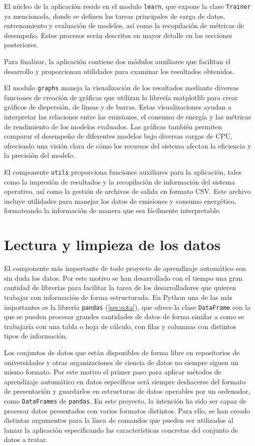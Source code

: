 El núcleo de la aplicación reside en el modulo \texttt{learn}, que expone la clase \texttt{Trainer} ya mencionada, donde se definen las tareas principales de carga de datos, entrenamiento y evaluación de modelos, así como la recopilación de métricas de desempeño. Estos procesos serán descritos en mayor detalle en las secciones posteriores.

Para finalizar, la aplicación contiene dos módulos auxiliares que facilitan el desarrollo y proporcionan utilidades para examinar los resultados obtenidos.

El modulo \texttt{graphs} maneja la visualización de los resultados mediante diversas funciones de creación de gráficas que utilizan la librería matplotlib para crear gráficos de dispersión, de líneas y de barras. Estas visualizaciones ayudan a interpretar las relaciones entre las emisiones, el consumo de energía y las métricas de rendimiento de los modelos evaluados. Las gráficas también permiten comparar el desempeño de diferentes modelos bajo diversas cargas de CPU, ofreciendo una visión clara de cómo los recursos del sistema afectan la eficiencia y la precisión del modelo.

El componente \texttt{utils} proporciona funciones auxiliares para la aplicación, tales como la impresión de resultados y la recopilación de información del sistema operativo, así como la gestión de archivos de salida en formato CSV. Este archivo incluye utilidades para manejar los datos de emisiones y consumo energético, formateando la información de manera que sea fácilmente interpretable. 


\section{Lectura y limpieza de los datos}
\label{sec:limpieza}

El componente más importante de todo proyecto de aprendizaje automático son sin duda los datos. Por este motivo se han desarrollado con el tiempo una gran cantidad de librerías para facilitar la tarea de los desarrolladores que quieren trabajar con información de forma estructurada. En Python una de las más importantes es la librería \texttt{pandas} (\ref{sec:sota}), que ofrece la clase \texttt{DataFrame} con la que se pueden procesar grandes cantidades de datos de forma similar a como se trabajaría con una tabla o hoja de cálculo, con filas y columnas con distintos tipos de información.

Los conjuntos de datos que están disponibles de forma libre en repositorios de universidades y otras organizaciones de ciencia de datos no siempre siguen un mismo formato. Por este motivo el primer paso para aplicar métodos de aprendizaje automático en datos específicos será siempre deshacerse del formato de presentación y guardarlos en estructuras de datos operables por un ordenador, como \texttt{DataFrames} de \texttt{pandas}. En este proyecto, la intención ha sido ser capaz de procesar datos presentados con varios formatos distintos. Para ello, se han creado distintas argumentos para la línea de comandos que pueden ser utilizados al lanzar la aplicación especificando las características concretas del conjunto de datos a tratar.

